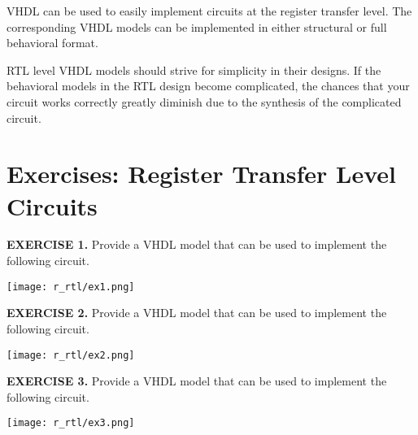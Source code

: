 \begin{my_list}
\item VHDL can be used to easily implement circuits at the register transfer level. The corresponding VHDL models can be implemented in either structural or full behavioral format.

\item RTL level VHDL models should strive for simplicity in their designs. If the behavioral models in the RTL design become complicated, the chances that your circuit works correctly greatly diminish due to the synthesis of the complicated circuit.
\end{my_list}

\section{Exercises: Register Transfer Level Circuits}

\vspace{20pt}
\noindent
\begin{minipage}[t]{0.5\textwidth}
\textbf{EXERCISE 1.}
Provide a VHDL model that can be used to implement the following circuit.
\end{minipage}
\begin{minipage}[t]{0.47\textwidth}
\vspace{0pt}\raggedright
\centering
\texttt{[image: r\_rtl/ex1.png]}
\end{minipage}

\vspace{20pt}
\noindent
\begin{minipage}[t]{0.5\textwidth}
\textbf{EXERCISE 2.}
Provide a VHDL model that can be used to implement the following circuit.
\end{minipage}
\begin{minipage}[t]{0.47\textwidth}
\vspace{0pt}\raggedright
\centering
\texttt{[image: r\_rtl/ex2.png]}
\end{minipage}

\vspace{20pt}
\noindent
\begin{minipage}[t]{0.5\textwidth}
\textbf{EXERCISE 3.}
Provide a VHDL model that can be used to implement the following circuit.
\end{minipage}
\begin{minipage}[t]{0.47\textwidth}
\vspace{0pt}\raggedright
\centering
\texttt{[image: r\_rtl/ex3.png]}
\end{minipage}

